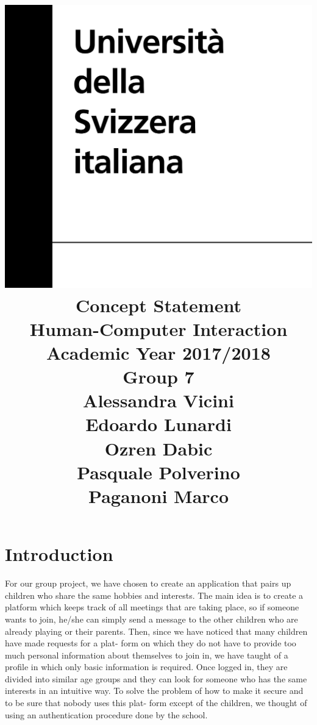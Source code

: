 \documentclass[12pt]{article}
\title {
\includegraphics[width = .2\linewidth]{University-of-Lugano.png} \break \break
{\bf\Huge Concept Statement}
\\\large Human-Computer Interaction
\\\small Academic Year 2017/2018 \break
\\\large \textbf{Group 7}
\\\large Alessandra Vicini \\ Edoardo Lunardi \\ Ozren Dabic \\ Pasquale Polverino \\ Paganoni Marco}
\begin{document}
\maketitle

\newpage

\part*{Introduction}

For our group project, we have chosen to create an application that pairs up children who share the same hobbies and interests. The main idea is to create a platform which keeps track of all meetings that are taking place, so if someone wants to join, he/she can simply send a message to the other children who are already playing or their parents. Then, since we have noticed that many children have made requests for a plat- form on which they do not have to provide too much personal information about themselves to join in, we have taught of a profile in which only basic information is required. Once logged in, they are divided into similar age groups and they can look for someone who has the same interests in an intuitive way. To solve the problem of how to make it secure and to be sure that nobody uses this plat- form except of the children, we thought of using an authentication procedure done by the school. \\
\end{document}
